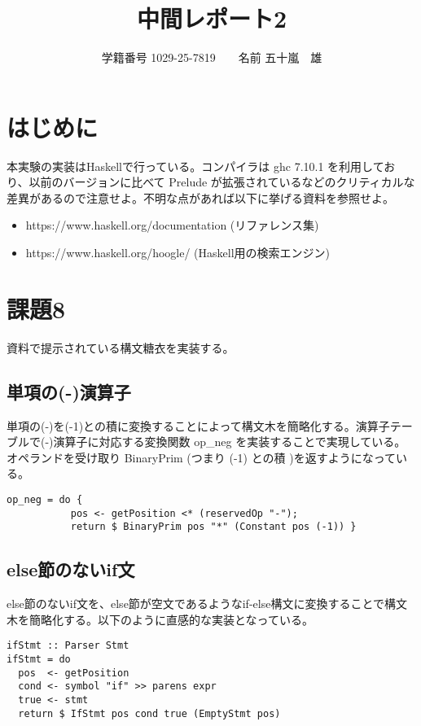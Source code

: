 \documentclass{jsarticle}
\begin{document}
\title{中間レポート2}
\author{学籍番号 1029-25-7819　　名前 五十嵐　雄}
\date{}
\maketitle

\section{はじめに}
本実験の実装はHaskellで行っている。コンパイラは ghc 7.10.1 を利用しており、以前のバージョンに比べて Prelude が拡張されているなどのクリティカルな差異があるので注意せよ。不明な点があれば以下に挙げる資料を参照せよ。
\begin{itemize}
\item https://www.haskell.org/documentation (リファレンス集)
\item https://www.haskell.org/hoogle/ (Haskell用の検索エンジン)
\end{itemize}

\section{課題8}
資料で提示されている構文糖衣を実装する。\\
\subsection{単項の(-)演算子}
単項の(-)を(-1)との積に変換することによって構文木を簡略化する。演算子テーブルで(-)演算子に対応する変換関数 op\_neg を実装することで実現している。オペランドを受け取り BinaryPrim (つまり (-1) との積 )を返すようになっている。
\begin{verbatim}
op_neg = do {
           pos <- getPosition <* (reservedOp "-");
           return $ BinaryPrim pos "*" (Constant pos (-1)) }
\end{verbatim}

\subsection{else節のないif文}
else節のないif文を、else節が空文であるようなif-else構文に変換することで構文木を簡略化する。以下のように直感的な実装となっている。
\begin{verbatim}
ifStmt :: Parser Stmt
ifStmt = do
  pos  <- getPosition
  cond <- symbol "if" >> parens expr
  true <- stmt
  return $ IfStmt pos cond true (EmptyStmt pos)
\end{verbatim}
\end{document}
